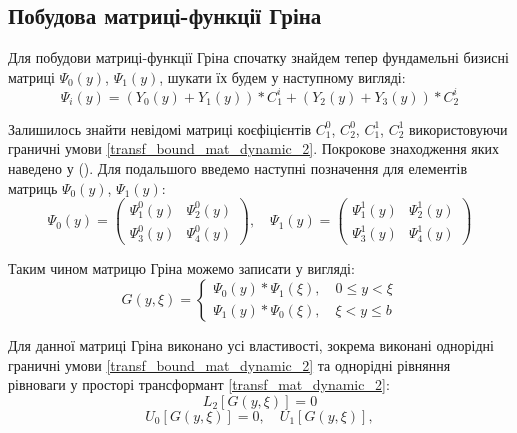 \subsection{Побудова матриці-функції Гріна}
Для побудови матриці-функції Гріна спочатку знайдем тепер фундамельні бизисні матриці $\Psi_0(y)$, $\Psi_1(y)$, шукати їх будем у наступному вигляді:
\begin{equation}\label{psi_dynamic_2}
    \Psi_i(y) = \left( Y_0(y) + Y_1(y) \right) * C_1^i + \left( Y_2(y) + Y_3(y) \right) * C_2^i
\end{equation}

Залишилось знайти невідомі матриці коєфіцієнтів $C_1^0$, $C_2^0$, $C_1^1$, $C_2^1$ використовуючи граничні умови \eqref{transf_bound_mat_dynamic_2}.
Покрокове знаходження яких наведено у ().
Для подальшого введемо наступні позначення для елементів матриць $\Psi_0(y)$, $\Psi_1(y)$:
\begin{equation*}
    \Psi_0(y) = \begin{pmatrix}
        \Psi_1^0(y) &  \Psi_2^0(y) \\
        \Psi_3^0(y) &  \Psi_4^0(y) 
    \end{pmatrix}, \quad 
    \Psi_1(y) = \begin{pmatrix}
        \Psi_1^1(y) &  \Psi_2^1(y) \\
        \Psi_3^1(y) &  \Psi_4^1(y) 
    \end{pmatrix}      
\end{equation*}

Таким чином матрицю Гріна можемо записати у вигляді:
\begin{equation}
    G(y,\xi) = 
    \begin{cases}
        \Psi_0(y) * \Psi_1(\xi), \quad 0 \le y < \xi \\
        \Psi_1(y) * \Psi_0(\xi), \quad \xi < y \le b
    \end{cases}
\end{equation}

Для данної матриці Гріна виконано усі властивості, зокрема виконані однорідні граничні умови \eqref{transf_bound_mat_dynamic_2}
та однорідні рівняння рівноваги у просторі трансформант \eqref{transf_mat_dynamic_2}:
\begin{equation*}
    L_2\left[  G(y, \xi) \right] = 0
\end{equation*}
\begin{equation*}
    U_0\left[ G(y, \xi) \right] = 0, \quad  U_1\left[ G(y, \xi) \right],
\end{equation*}

